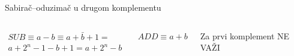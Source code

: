 
\begin{frame}[label=05-s028]{Sabirač–oduzimač u drugom komplementu}
\fontsize{10}{12}\selectfont\setlength{\abovedisplayskip}{3pt}\setlength{\belowdisplayskip}{3pt}\setlength{\parskip}{0pt}

\begin{columns}[c,onlytextwidth]
\centering
{}\centering
\end{columns}
\begin{columns}[c,onlytextwidth]
\centering
$\begin{gathered}SUB\equiv a-b\equiv a+\bar b+1=\\a+2^n-1-b+1=a+2^n-b\end{gathered}$\par\vspace{1mm}
$ADD\equiv a+b$
\centering
\par\vspace{2mm}
\alert{Za prvi komplement NE VAŽI}
\end{columns}
\end{frame}
